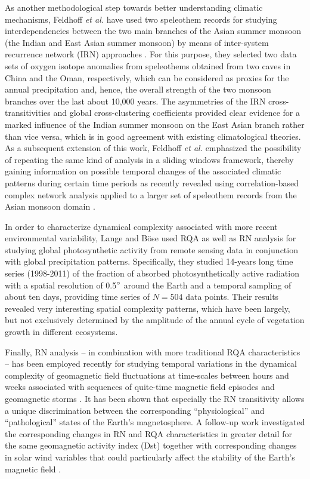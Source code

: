 		As another methodological step towards better understanding climatic mechanisms, Feldhoff {\textit{et al.}} have used two speleothem records for studying interdependencies between the two main branches of the Asian summer monsoon (the Indian and East Asian summer monsoon) by means of inter-system recurrence network (IRN) approaches \cite{Feldhoff2012,Marwan2012Nolta}. For this purpose, they selected two data sets of oxygen isotope anomalies from speleothems obtained from two caves in China and the Oman, respectively, which can be considered as proxies for the annual precipitation and, hence, the overall strength of the two monsoon branches over the last about 10,000 years. The asymmetries of the IRN cross-transitivities and global cross-clustering coefficients provided clear evidence for a marked influence of the Indian summer monsoon on the East Asian branch rather than vice versa, which is in good agreement with existing climatological theories. As a subsequent extension of this work, Feldhoff {\textit{et al.}} emphasized the possibility of repeating the same kind of analysis in a sliding windows framework, thereby gaining information on possible temporal changes of the associated climatic patterns during certain time periods as recently revealed using correlation-based complex network analysis applied to a larger set of speleothem records from the Asian monsoon domain \cite{Rehfeld2012}.

		In order to characterize dynamical complexity associated with more recent environmental variability, Lange and B\"ose \cite{Boese2012,Lange2013Book} used RQA as well as RN analysis for studying global photosynthetic activity from remote sensing data in conjunction with global precipitation patterns. Specifically, they studied 14-years long time series (1998-2011) of the fraction of absorbed photosynthetically active radiation with a spatial resolution of 0.5$\degree$ around the Earth and a temporal sampling of about ten days, providing time series of $N=504$ data points. Their results revealed very interesting spatial complexity patterns, which have been largely, but not exclusively determined by the amplitude of the annual cycle of vegetation growth in different ecosystems.

Finally, RN analysis -- in combination with more traditional RQA characteristics -- has been employed recently for studying temporal variations in the dynamical complexity of geomagnetic field fluctuations at time-scales between hours and weeks associated with sequences of quite-time magnetic field episodes and geomagnetic storms \cite{Donner2018}. It has been shown that especially the RN transitivity allows a unique discrimination between the corresponding ``physiological'' and ``pathological'' states of the Earth's magnetosphere. A follow-up work investigated the corresponding changes in RN and RQA characteristics in greater detail for the same geomagnetic activity index (Dst) together with corresponding changes in solar wind variables that could particularly affect the stability of the Earth's magnetic field \cite{Donner2018b}.

